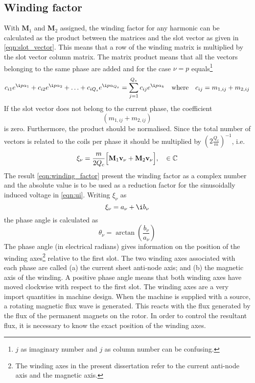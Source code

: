 \subsection{Winding factor}
With $\mathbf{M}_1$ and $\mathbf{M}_2$ assigned, the winding factor for any harmonic can be calculated as the product between the matrices and the slot vector as given in \eqref{eqn:slot_vector}. This means that a row of the winding matrix is multiplied by the slot vector column matrix. The matrix product means that all the vectors belonging to the same phase are added and for the case $\nu=p$ equals\footnote{$j$ as imaginary number and $j$ as column number can be confusing.}
\begin{equation}
  \label{eqn:m1_m2_exp}
  c_{i1}e^{\i p\alpha_1}+c_{i2}e^{\i p\alpha_2}+\ldots+
  c_{iQ_s}e^{\i p \alpha_{Q_s}} = \sum_{j=1}^{Q_s}c_{ij}e^{\i p\alpha_k}
  \quad \mbox{where} \quad
  c_{ij} = m_{1,ij}+m_{2,ij}
\end{equation}
If the slot vector does not belong to the current phase, the coefficient
\begin{equation} 
  \left(m_{1,ij}+m_{2,ij}\right)
\end{equation} 
is zero. Furthermore, the product should be normalised. Since the total number of vectors is related to the coils per phase it should be multiplied by $\left(2\frac{Q_c}{m}\right)^{-1}$, i.e.
\begin{equation}
  \label{eqn:winding_factor}
  \xi_{\nu} = \frac{m}{2Q_c}
  \Bigl[
    \mathbf{M}_1\mathbf{v_{\nu}}+\mathbf{M}_2\mathbf{v_{\nu}}
  \Bigr], 
  \quad \in \mathbb{C}
\end{equation}
The result \eqref{eqn:winding_factor} present the winding factor as a complex number and the absolute value is to be used as a reduction factor for the sinusoidally induced voltage in \eqref{eqn:ui}. Writing $\xi_{\nu}$ as
\begin{equation}
  \xi_{\nu} = a_{\nu}+\i b_{\nu}
\end{equation}
the phase angle is calculated as 
\begin{equation}
  \theta_{\nu} = \arctan\left(\frac{b_{\nu}}{a_{\nu}}\right)
\end{equation}
The phase angle (in electrical radians) gives information on the position of the winding axes\footnote{The winding axes in the present dissertation refer to the current anti-node axis and the magnetic axis.} relative to the first slot. The two winding axes associated with each phase are called (a) the current sheet anti-node axis; and (b) the magnetic axis of the winding. A positive phase angle means that both winding axes have moved clockwise with respect to the first slot. The winding axes are a very import quantities in machine design. When the machine is supplied with a source, a rotating magnetic flux wave is generated. This reacts with the flux generated by the flux of the permanent magnets on the rotor. In order to control the resultant flux, it is necessary to know the exact position of the winding axes.  


